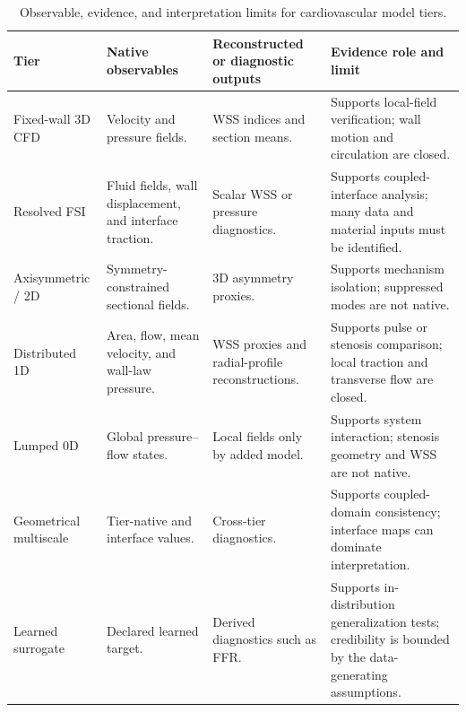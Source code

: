 \begin{table}[!htb]
    \centering
    \scriptsize
    \caption{Observable, evidence, and interpretation limits for cardiovascular
    model tiers.}
    \label{tab:model-hierarchy-observation-evidence}
    \begin{tabularx}{\textwidth}{@{}
        >{\raggedright\arraybackslash}p{}
        >{\raggedright\arraybackslash}p{}
        >{\raggedright\arraybackslash}p{}
        >{\raggedright\arraybackslash}X@{}}
        \toprule
        \textbf{Tier}
            & \textbf{Native observables}
            & \textbf{Reconstructed or diagnostic outputs}
            & \textbf{Evidence role and limit} \\
        \midrule
        Fixed-wall 3D CFD
            & Velocity and pressure fields.
            & WSS indices and section means.
            & Supports local-field verification; wall motion and circulation
            are closed. \\
        Resolved FSI
            & Fluid fields, wall displacement, and interface traction.
            & Scalar WSS or pressure diagnostics.
            & Supports coupled-interface analysis; many data and material
            inputs must be identified. \\
        Axisymmetric / 2D
            & Symmetry-constrained sectional fields.
            & 3D asymmetry proxies.
            & Supports mechanism isolation; suppressed modes are not native. \\
        Distributed 1D
            & Area, flow, mean velocity, and wall-law pressure.
            & WSS proxies and radial-profile reconstructions.
            & Supports pulse or stenosis comparison; local traction and
            transverse flow are closed. \\
        Lumped 0D
            & Global pressure--flow states.
            & Local fields only by added model.
            & Supports system interaction; stenosis geometry and WSS are not
            native. \\
        Geometrical multiscale
            & Tier-native and interface values.
            & Cross-tier diagnostics.
            & Supports coupled-domain consistency; interface maps can dominate
            interpretation. \\
        Learned surrogate
            & Declared learned target.
            & Derived diagnostics such as FFR.
            & Supports in-distribution generalization tests; credibility is
            bounded by the data-generating assumptions. \\
        \bottomrule
    \end{tabularx}
\end{table}


